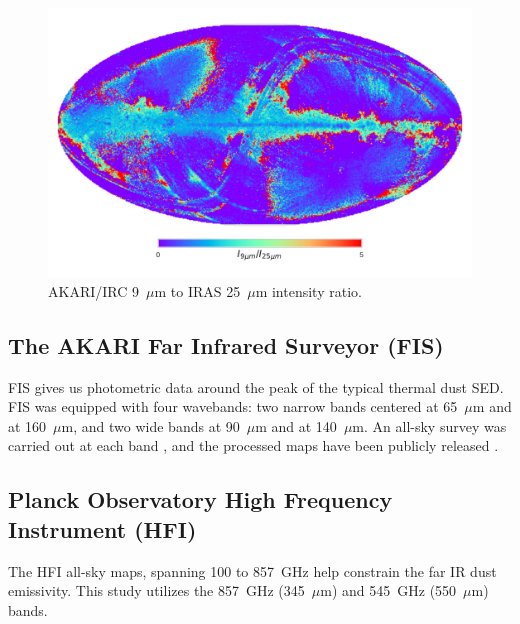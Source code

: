        \begin{figure}
         \centering
         \includegraphics[width=\textwidth]{../Plots/ch_datasources/ratioMap_A9I25.pdf}
         \caption{ AKARI/IRC 9~$\mu$m to IRAS 25~$\mu$m intensity ratio.}
         \label{fig:ratioMap_A9I25}
       \end{figure}

      \subsection{The AKARI Far Infrared Surveyor (FIS)}
           FIS gives us photometric data around the peak of the typical thermal dust SED. FIS was equipped with four wavebands: two narrow bands centered at 65~$\mu$m and at 160~$\mu$m, and two wide bands at 90~$\mu$m and at 140~$\mu$m. An all-sky survey was carried out at each band \citep{kawada07}, and the processed maps have been publicly released \citep{doi15}.
    \subsection{Planck Observatory High Frequency Instrument (HFI)}
       The HFI all-sky maps, spanning 100 to 857~GHz \citep{hfi14viii} help constrain the far IR dust emissivity. This study utilizes the 857~GHz (345~$\mu$m) and 545~GHz (550~$\mu$m) bands.

